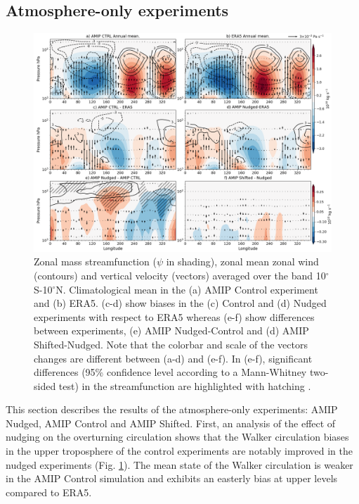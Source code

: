\subsection{Atmosphere-only experiments}

\begin{figure}[t!]
\centering
 \includegraphics[width=\linewidth]{figures/suite_streamwalkerclim.png}
\caption[Walker in atmosphere-only experiments]{Zonal mass streamfunction ($\psi$ in shading), zonal mean zonal wind (contours) and vertical velocity (vectors) averaged over the band 10$^\circ$S-10$^\circ$N. Climatological mean in the (a) AMIP Control experiment and (b) ERA5. (c-d) show biases in the (c) Control and (d) Nudged experiments with respect to ERA5 whereas (e-f) show differences between experiments, (e) AMIP Nudged-Control and (d) AMIP Shifted-Nudged. Note that the colorbar and scale of the vectors changes are different between (a-d) and (e-f). In (e-f), significant differences (95\% confidence level according to a Mann-Whitney two-sided test) in the streamfunction are highlighted with hatching . }
\label{fig:walkeramip}
\end{figure}

This section describes the results of the atmosphere-only experiments: AMIP Nudged, AMIP Control and AMIP Shifted. First, an analysis of the effect of nudging on the overturning circulation shows that the Walker circulation biases in the upper troposphere of the control experiments are notably improved in the nudged experiments (Fig. \ref{fig:walkeramip}). The mean state of the Walker circulation is weaker in the AMIP Control simulation and exhibits an easterly bias at upper levels compared to ERA5. 

